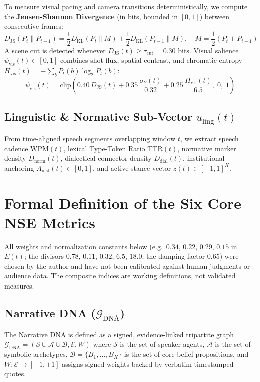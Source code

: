 \documentclass[10pt,letterpaper]{article}
\begin{document}
To measure visual pacing and camera transitions deterministically, we compute the \textbf{Jensen-Shannon Divergence} \cite{Lin1991} (in bits, bounded in $[0, 1]$) between consecutive frames:
\begin{equation}
  D_{\mathrm{JS}}(P_t \parallel P_{t-1}) = \frac{1}{2} D_{\mathrm{KL}}(P_t \parallel M) + \frac{1}{2} D_{\mathrm{KL}}(P_{t-1} \parallel M), \quad M = \frac{1}{2}(P_t + P_{t-1})
\end{equation}
A scene cut is detected whenever $D_{\mathrm{JS}}(t) \ge \tau_{\mathrm{cut}} = 0.30\text{ bits}$. Visual salience $\psi_{\mathrm{vis}}(t) \in [0, 1]$ combines shot flux, spatial contrast, and chromatic entropy $H_{\mathrm{vis}}(t) = -\sum_b P_t(b)\log_2 P_t(b)$:
\begin{equation}
  \psi_{\mathrm{vis}}(t) = \mathrm{clip}\!\left(0.40\,D_{\mathrm{JS}}(t) + 0.35\,\frac{\sigma_Y(t)}{0.32} + 0.25\,\frac{H_{\mathrm{vis}}(t)}{6.5},\; 0,\; 1\right)
\end{equation}

\subsection{Linguistic \& Normative Sub-Vector \texorpdfstring{$u_{\mathrm{ling}}(t)$}{u\_ling(t)}}
From time-aligned speech segments overlapping window $t$, we extract speech cadence $\mathrm{WPM}(t)$, lexical Type-Token Ratio $\mathrm{TTR}(t)$, normative marker density $D_{\mathrm{norm}}(t)$, dialectical connector density $D_{\mathrm{dial}}(t)$, institutional anchoring $A_{\mathrm{inst}}(t) \in [0, 1]$, and active stance vector $z(t) \in [-1, 1]^K$.

\section{Formal Definition of the Six Core NSE Metrics}

All weights and normalization constants below (e.g.\ $0.34$, $0.22$, $0.29$, $0.15$ in $E(t)$; the divisors $0.78$, $0.11$, $0.32$, $6.5$, $18.0$; the damping factor $0.65$) were chosen by the author and have not been calibrated against human judgments or audience data. The composite indices are working definitions, not validated measures.

\subsection{Narrative DNA (\texorpdfstring{$\mathcal{G}_{\mathrm{DNA}}$}{G\_DNA})}
The Narrative DNA is defined as a signed, evidence-linked tripartite graph $\mathcal{G}_{\mathrm{DNA}} = (\mathcal{S} \cup \mathcal{A} \cup \mathcal{B}, \mathcal{E}, W)$ where $\mathcal{S}$ is the set of speaker agents, $\mathcal{A}$ is the set of symbolic archetypes, $\mathcal{B} = \{B_1, \dots, B_K\}$ is the set of core belief propositions, and $W: \mathcal{E} \to [-1, +1]$ assigns signed weights backed by verbatim timestamped quotes.
\end{document}
